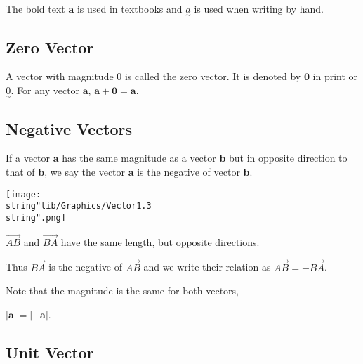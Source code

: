\documentclass[11pt,a4paper]{book}
\begin{document}
The bold text $\textbf{a}$ is used in textbooks and $\underset{\sim}{a}$
is used when writing by hand.

\subsection{Zero Vector }

A vector with magnitude $0$ is called the zero vector. It is denoted
by $\textbf{0}$ in print or $\underset{\sim}{0}$. For any vector
$\textbf{a}$, $\textbf{a}+\textbf{0}=\textbf{a}$.


\subsection{Negative Vectors}

If a vector $\textbf{a}$ has the same magnitude as a vector $\textbf{b}$
but in opposite direction to that of $\textbf{b}$, we say the vector
$\textbf{a}$ is the negative of vector $\textbf{b}$.

\begin{minipage}[t]{0.4\textwidth}
\begin{center}
\texttt{[image: \\string"lib/Graphics/Vector1.3\\string".png]}
\par\end{center}

\end{minipage}
\begin{minipage}[t]{0.6\textwidth}

\begin{tcolorbox}[colback=blue!5, colframe=black, boxrule=.4pt, sharpish corners]

$\overrightarrow{AB}$ and $\overrightarrow{BA}$ have the same length,
but opposite directions.

\medskip{}

Thus $\overrightarrow{BA}$ is the negative of $\overrightarrow{AB}$
and we write their relation as $\overrightarrow{AB}=-\overrightarrow{BA}$.

\medskip{}

Note that the magnitude is the same for both vectors,

$\left|\textbf{a}\right|=\left|-\textbf{a}\right|$.
\end{tcolorbox}

\end{minipage}

\subsection{Unit Vector}
\begin{center}
\par\end{center}
\end{document}

